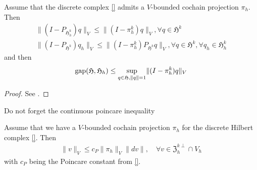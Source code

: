 \documentclass[../master_thesis.tex]{subfiles}
\begin{document}
\begin{proposition}
    Assume that the discrete complex \ref{} admits a $V$-bounded cochain projection
    $\pi_h$. Then
    \begin{align*}
        \lVert (I - P_{\mathfrak{H}^k_h}) q \rVert _V \leq \lVert (I - \pi_h^k) q \rVert _V, 
            \forall q \in \mathfrak{H}^k 
        \\ \lVert (I - P_{\mathfrak{H}^k}) q_h \rVert _V 
        \leq \lVert (I - \pi_h^k)P_{\mathfrak{H}^k} q \rVert _V, \forall q \in \mathfrak{H}^k, 
                \forall q_h \in \mathfrak{H}^k_h 
    \end{align*}
    and then 
    \begin{align*}
        \operatorname{gap} (\mathfrak{H}, \mathfrak{H}_h) 
        \leq \sup_{q \in \mathfrak{H}, \lVert q \rVert = 1} \lVert (I - \pi_h^k) q \rVert_V
    \end{align*}
\end{proposition}
\begin{proof}
    See \cite[Thm.\,5.2]{arnold}. 
\end{proof}
{\color{red} Do not forget the continuous poincare inequality}
\begin{proposition}
    Assume that we have a $V$-bounded cochain projection $\pi_h$ for 
    the discrete Hilbert complex \ref{}. Then 
    \begin{align*}
        \lVert v \rVert _V \leq c_P \lVert \pi_h \rVert _V \lVert dv \rVert, 
            \quad \forall v \in \mathfrak{Z}_h^{k\perp}\cap V_h
    \end{align*}
    with $c_P$ being the Poincare constant from \ref{}.
\end{proposition}
\end{document}
